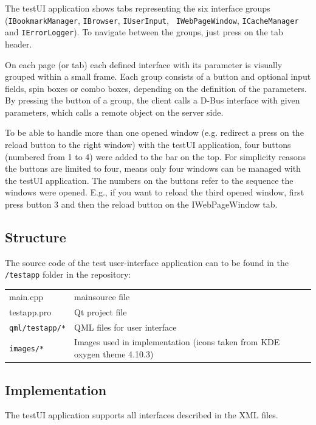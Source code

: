 \documentclass{pelagicore}
\begin{document}
The testUI application shows tabs representing the six interface groups
({\tt IBook\-mark\-Manager}, {\tt IBrowser}, {\tt IUserInput}, {\tt
IWebPageWindow}, {\tt ICacheManager} and {\tt IErrorLogger}). To navigate
between the groups, just press on the tab header.

On each page (or tab) each defined interface with its parameter is visually
grouped within a small frame. Each group consists of a button and optional
input fields, spin boxes or combo boxes, depending on the definition of the
parameters. By pressing the button of a group, the client calls a D-Bus
interface with given parameters, which calls a remote object on the server
side.

To be able to handle more than one opened window (e.g. redirect a press on the
reload button to the right window) with the testUI application, four buttons
(numbered from 1 to 4) were added to the bar on the top. For simplicity reasons
the buttons are limited to four, means only four windows can be managed with
the testUI application. The numbers on the buttons refer to the sequence the
windows were opened. E.g., if you want to reload the third opened window, first
press button 3 and then the reload button on the IWebPageWindow tab.

\subsection{Structure}
The source code of the test user-interface application can to be found in the
{\tt /testapp} folder in the repository:

\begin{tabularx}{0.9\textwidth}{l X}
    main.cpp            & mainsource file \\
    testapp.pro         & Qt project file \\
    {\tt qml/testapp/*} & QML files for user interface \\
    {\tt images/*}      & Images used in implementation (icons taken from KDE
                          oxygen theme 4.10.3)
\end{tabularx}

\subsection{Implementation}
The testUI application supports all interfaces described in the XML files.
\end{document}
